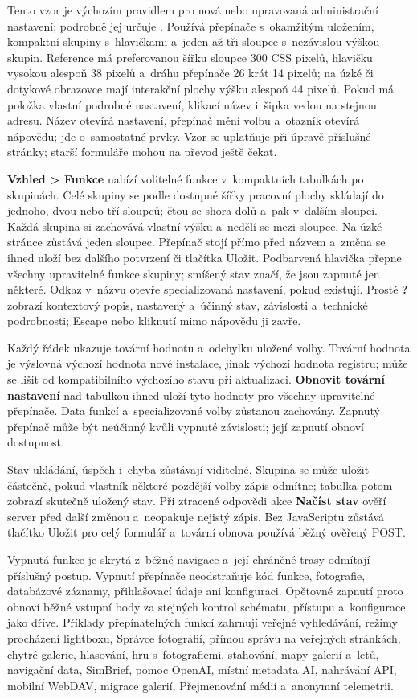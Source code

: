 \documentclass[11pt,a4paper]{article}
\newcommand{\ui}[1]{\textbf{#1}}
\begin{document}
Tento vzor je výchozím pravidlem pro nová nebo upravovaná administrační
nastavení; podrobně jej určuje . Používá přepínače
s~okamžitým uložením, kompaktní skupiny s~hlavičkami a~jeden až tři sloupce
s~nezávislou výškou skupin. Reference má preferovanou šířku sloupce 300 CSS
pixelů, hlavičku vysokou alespoň 38 pixelů a~dráhu přepínače 26 krát 14 pixelů;
na úzké či dotykové obrazovce mají interakční plochy výšku alespoň 44 pixelů.
Pokud má položka vlastní podrobné nastavení, klikací název i~šipka vedou na
stejnou adresu. Název otevírá nastavení, přepínač mění volbu a~otazník otevírá
nápovědu; jde o~samostatné prvky. Vzor se uplatňuje při úpravě příslušné
stránky; starší formuláře mohou na převod ještě čekat.

\ui{Vzhled > Funkce} nabízí volitelné funkce v~kompaktních tabulkách po
skupinách. Celé skupiny se podle dostupné šířky pracovní plochy skládají do
jednoho, dvou nebo tří sloupců; čtou se shora dolů a~pak v~dalším sloupci.
Každá skupina si zachovává vlastní výšku a~nedělí se mezi sloupce. Na úzké
stránce zůstává jeden sloupec. Přepínač stojí přímo před názvem a~změna se
ihned uloží bez dalšího potvrzení či tlačítka Uložit. Podbarvená hlavička
přepne všechny upravitelné
funkce skupiny; smíšený stav značí, že jsou zapnuté jen některé. Odkaz v~názvu
otevře specializovaná nastavení, pokud existují. Prosté \ui{?} zobrazí
kontextový popis, nastavený a~účinný stav, závislosti a~technické podrobnosti;
Escape nebo kliknutí mimo nápovědu ji zavře.

Každý řádek ukazuje tovární hodnotu a~odchylku uložené volby. Tovární hodnota je
výslovná výchozí hodnota nové instalace, jinak výchozí hodnota registru; může se
lišit od kompatibilního výchozího stavu při aktualizaci. \ui{Obnovit tovární
nastavení} nad tabulkou ihned uloží tyto hodnoty pro všechny upravitelné
přepínače. Data funkcí a~specializované volby zůstanou zachovány. Zapnutý
přepínač může být neúčinný kvůli vypnuté závislosti; její zapnutí obnoví
dostupnost.

Stav ukládání, úspěch i~chyba zůstávají viditelné. Skupina se může uložit
částečně, pokud vlastník některé pozdější volby zápis odmítne; tabulka potom
zobrazí skutečně uložený stav. Při ztracené odpovědi akce \ui{Načíst stav} ověří
server před další změnou a~neopakuje nejistý zápis. Bez JavaScriptu zůstává
tlačítko Uložit pro celý formulář a~tovární obnova používá běžný ověřený POST.

Vypnutá funkce je skrytá z~běžné navigace a~její chráněné trasy odmítají
příslušný postup. Vypnutí přepínače neodstraňuje kód funkce, fotografie,
databázové záznamy, přihlašovací údaje ani konfiguraci. Opětovné zapnutí proto
obnoví běžné vstupní body za stejných kontrol schématu, přístupu a~konfigurace
jako dříve. Příklady přepínatelných funkcí zahrnují veřejné vyhledávání, režimy
procházení lightboxu, Správce fotografií, přímou správu na veřejných stránkách,
chytré galerie, hlasování, hru s~fotografiemi, stahování, mapy galerií a~letů,
navigační data, SimBrief, pomoc OpenAI, místní metadata AI, nahrávání API,
mobilní WebDAV, migrace galerií, Přejmenování médií a~anonymní telemetrii.
\end{document}
